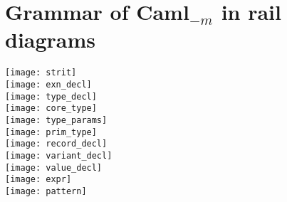 
\section{Grammar of Caml$_{-m}$ in rail diagrams}
\label{sec:grammar}
\texttt{[image: strit]} \\[0.2em]
\texttt{[image: exn\_decl]} \\[0.2em]
\texttt{[image: type\_decl]} \\[0.2em]
\texttt{[image: core\_type]} \\[0.2em]
\texttt{[image: type\_params]} \\[0.2em]
\texttt{[image: prim\_type]} \\[0.2em]
\texttt{[image: record\_decl]} \\[0.2em]
\texttt{[image: variant\_decl]} \\[0.2em]
\texttt{[image: value\_decl]} \\[0.2em]
\texttt{[image: expr]} \\[0.2em]
\texttt{[image: pattern]} \\[0.2em]


